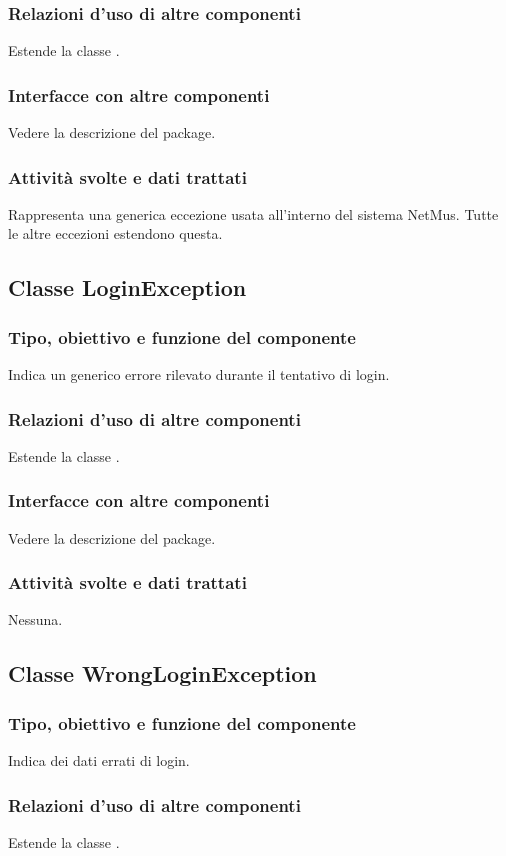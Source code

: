 \subsubsection*{Relazioni d'uso di altre componenti}
Estende la classe .
\subsubsection*{Interfacce con altre componenti}
Vedere la descrizione del package.
\subsubsection*{Attivit\`a svolte e dati trattati}
Rappresenta una generica eccezione usata all'interno del sistema NetMus. Tutte
le altre eccezioni estendono questa.

\subsection{Classe LoginException}
\subsubsection*{Tipo, obiettivo e funzione del componente}
Indica un generico errore rilevato durante il tentativo di login.
\subsubsection*{Relazioni d'uso di altre componenti}
Estende la classe .
\subsubsection*{Interfacce con altre componenti}
Vedere la descrizione del package.
\subsubsection*{Attivit\`a svolte e dati trattati}
Nessuna.

\subsection{Classe WrongLoginException}
\subsubsection*{Tipo, obiettivo e funzione del componente}
Indica dei dati errati di login.
\subsubsection*{Relazioni d'uso di altre componenti}
Estende la classe .
